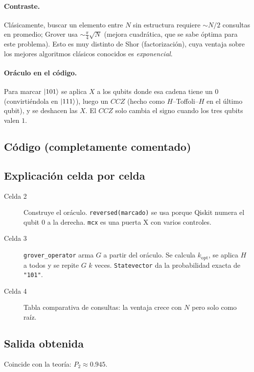 \paragraph{Contraste.} Clásicamente, buscar un elemento entre $N$ sin
estructura requiere $\sim N/2$ consultas en promedio; Grover usa
$\sim\tfrac\pi4\sqrt N$ (mejora cuadrática, que se sabe óptima para este
problema). Esto es muy distinto de Shor (factorización), cuya ventaja sobre
los mejores algoritmos clásicos conocidos es \emph{exponencial}.

\paragraph{Oráculo en el código.} Para marcar $\left|101\right\rangle$ se aplica $X$ a los
qubits donde esa cadena tiene un $0$ (convirtiéndola en $\left|111\right\rangle$), luego un
$CCZ$ (hecho como $H$--Toffoli--$H$ en el último qubit), y se deshacen las $X$.
El $CCZ$ solo cambia el signo cuando los tres qubits valen $1$.

\subsection{Código (completamente comentado)}


\subsection{Explicación celda por celda}
\begin{description}
  \item[Celda 2] Construye el oráculo. \texttt{reversed(marcado)} se usa
    porque Qiskit numera el qubit $0$ a la derecha. \texttt{mcx} es una puerta
    X con varios controles.
  \item[Celda 3] \texttt{grover\_operator} arma $G$ a partir del oráculo.
    Se calcula $k_{\text{opt}}$, se aplica $H$ a todos y se repite $G$
    $k$ veces. \texttt{Statevector} da la probabilidad exacta de
    \texttt{"101"}.
  \item[Celda 4] Tabla comparativa de consultas: la ventaja crece con $N$ pero
    solo como raíz.
\end{description}

\subsection{Salida obtenida}

Coincide con la teoría: $P_2\approx0.945$.

